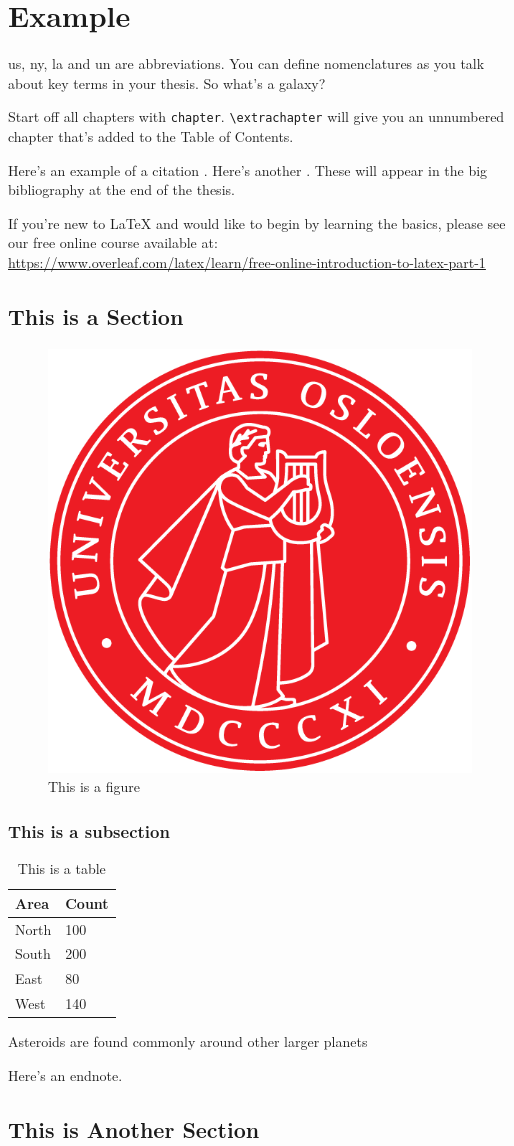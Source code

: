 \chapter{Example}

\ac{us}, \ac{ny}, \ac{la} and \ac{un} are abbreviations. You can define nomenclatures  as you talk about key terms in your thesis. So what's a galaxy? 

Start off all chapters with \verb|chapter|.  \verb|\extrachapter| will give you an unnumbered chapter that's added to the Table of Contents. 

Here's an example of a citation \citep{GMP81}. Here's another \citep{PP98}. These will appear in the big bibliography at the end of the thesis.

If you're new to \LaTeX{} and would like to begin by learning the basics, please see our free online course available at:\\ \url{https://www.overleaf.com/latex/learn/free-online-introduction-to-latex-part-1} 


\section{This is a Section}
\lipsum[1-2] \citep{Lin2016a,Berg2006}

\begin{figure}[hbt!]
\centering
\includegraphics[width=.3\textwidth]{uio.png}
\caption{This is a figure}\label{fig:logo}
\end{figure}

\subsection{This is a subsection}

\begin{table}[hbt!]
\centering
\begin{tabular}{ll}
\hline
Area & Count\\
\hline
North & 100\\
South & 200\\
East & 80\\
West & 140\\
\hline
\end{tabular}
\caption{This is a table}\label{tab:sample}
\end{table}

\lipsum[3] Asteroids are found commonly around other larger planets

\lipsum[4-5] 

Here's an endnote.

\section{This is Another Section}
\lipsum[6-7] 
